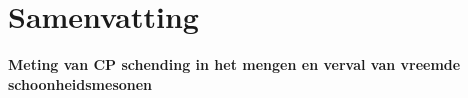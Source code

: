 \chapter*{Samenvatting}
\chaptermark{}

{\Large\bf
  Meting van CP schending in het mengen en verval van vreemde schoonheidsmesonen
}
\vspace*{0.05\textwidth}

\noindent
